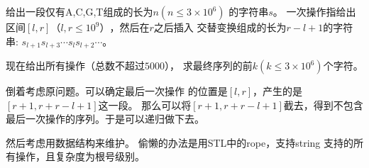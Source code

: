 \begin{prob}
	给出一段仅有A,C,G,T组成的长为$n(n \le 3 \times 10^6)$
	的字符串$s$。
	一次操作指给出区间$[l,r]（l,r \le 10^9）$，然后在$r$之后插入
	交替变换组成的长为$r-l+1$的字符串:
	$s_{l+1}s_{l+3}\cdots s_{l}s_{l+2}\cdots$。
	\par
	现在给出所有操作（总数不超过$5000$），
	求最终序列的前$k(k \le 3 \times 10^6)$个字符。
\end{prob}

\begin{sol}
	倒着考虑原问题。可以确定最后一次操作
	的位置是$[l,r]$，产生的是$[r+1,r+r-l+1]$这一段。
	那么可以将$[r+1,r+r-l+1]$截去，得到不包含
	最后一次操作的序列。于是可以递归做下去。\par
	然后考虑用数据结构来维护。
	偷懒的办法是用STL中的rope，支持string
	支持的所有操作，且复杂度为根号级别。

\end{sol}
